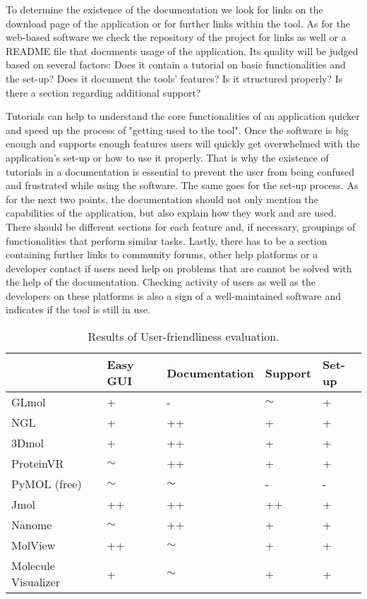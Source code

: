 To determine the existence of the documentation we look for links on the download page of the application or for further links within the tool. As for the web-based software we check the repository of the project for links as well or a README file that documents usage of the application. Its quality will be judged based on several factors: Does it contain a tutorial on basic functionalities and the set-up? Does it document the tools' features? Is it structured properly? Is there a section regarding additional support? 

Tutorials can help to understand the core functionalities of an application quicker and speed up the process of "getting used to the tool". Once the software is big enough and supports enough features users will quickly get overwhelmed with the application's set-up or how to use it properly. That is why the existence of tutorials in a documentation is essential to prevent the user from being confused and frustrated while using the software. The same goes for the set-up process. As for the next two points, the documentation should not only mention the capabilities of the application, but also explain how they work and are used. There should be different sections for each feature and, if necessary, groupings of functionalities that perform similar tasks. Lastly, there has to be a section containing further links to community forums, other help platforms or a developer contact if users need help on problems that are cannot be solved with the help of the documentation. Checking activity of users as well as the developers on these platforms is also a sign of a well-maintained software and indicates if the tool is still in use.

\begin{table}[t!]
\begin{tabularx}{\textwidth}{| X | X | X | X | X |}
\hline
& Easy GUI & Documentation & Support & Set-up \\ \hline
GLmol & + & - & $\sim$ & + \\ \hline
NGL & + & ++ & + & + \\ \hline
3Dmol & + & ++ & + & + \\ \hline
ProteinVR & $\sim$ & ++ & + & + \\ \hline
PyMOL (free) & $\sim$ & $\sim$ & - & - \\ \hline
Jmol & ++ & ++ & ++ & + \\ \hline
Nanome & $\sim$ & ++ & + & + \\ \hline
MolView & ++ & $\sim$ & + & + \\ \hline
Molecule Visualizer & + & $\sim$ & + & + \\ \hline
\end{tabularx}
\caption{Results of User-friendliness evaluation.}
\label{sec:evaluation:benchmark:userfriendeval}
\end{table}


